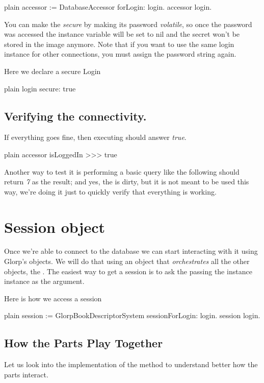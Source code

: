 \documentclass[10pt,twoside,english]{_support/latex/sbabook/sbabook}
\begin{document}
\begin{displaycode}{plain}
accessor := DatabaseAccessor forLogin: login.
accessor login.
\end{displaycode}

You can make the  \textit{secure} by making its password \textit{volatile}, so
once the password was accessed the instance variable will be set to nil and
the secret won't be stored in the image anymore. Note that if you want to
use the same login instance for other connections, you must assign the
password string again.

Here we declare a secure Login

\begin{displaycode}{plain}
login secure: true
\end{displaycode}
\subsection{Verifying the connectivity.}
If everything goes fine, then executing  should answer
\textit{true}. 

\begin{displaycode}{plain}
accessor isLoggedIn
>>> true
\end{displaycode}

Another way to test it is performing a basic query like the following
 should
return \textit{7} as the result; and yes, the  is dirty,
but it is not meant to be used this way, we're doing it just to quickly verify that everything is working.
\section{Session object}
Once we're able to connect to the database we can start interacting with it using
Glorp's objects. We will do that using an object that \textit{orchestrates}
 all the other objects, the . The easiest way to get a
session is to ask the  passing the  instance
instance as the argument.

Here is how we access a session

\begin{displaycode}{plain}
session := GlorpBookDescriptorSystem sessionForLogin: login.
session login.
\end{displaycode}
\subsection{How the Parts Play Together}
Let us look into the implementation of the method  to understand
better how the parts interact.
\end{document}
